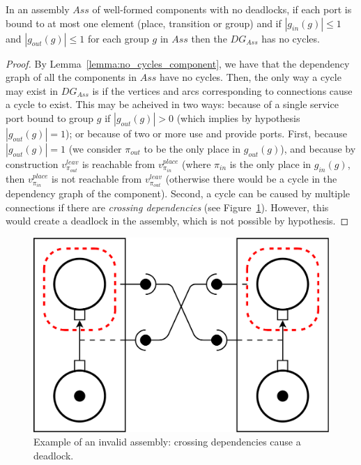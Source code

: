 \begin{lemma}
 In an assembly $Ass$ of well-formed components with no deadlocks, if each port
 is bound to at most one element (place, transition or group) and if
 $\left|g_{in}(g)\right|\leq 1$ and $\left|g_{out}(g)\right|\leq 1$ for each group
 $g$ in $Ass$ then the $DG_{Ass}$ has no cycles.
 \label{lemma:no_cycles_assembly}
\end{lemma}

\begin{proof}
 By Lemma~\ref{lemma:no_cycles_component}, we have that the dependency graph
 of all the components in $Ass$ have no cycles.
 Then, the only way a cycle may exist in $DG_{Ass}$ is if the vertices and arcs
 corresponding to connections cause a cycle to exist.
 This may be acheived in two ways: because of a single service port bound to
 group $g$ if $\left|g_{out}(g)\right|>0$ (which implies by hypothesis
 $\left|g_{out}(g)\right|=1$); or because of two or more use and provide ports.
 First, because $\left|g_{out}(g)\right|=1$ (we consider $\pi_{out}$ to be the only
 place in $g_{out}(g)$), and because by construction $v_{\pi_{out}}^{leav}$ is
 reachable from $v_{\pi_{in}}^{place}$ (where $\pi_{in}$ is the only place in $g_{in}(g)$,
 then $v_{\pi_{in}}^{place}$ is not reachable from $v_{\pi_{out}}^{leav}$ (otherwise
 there would be a cycle in the dependency graph of the component). Second, a
 cycle can be caused by multiple connections if there are \emph{crossing
 dependencies} (see Figure~\ref{fig:deadlock}). However, this would create a
 deadlock in the assembly, which is not possible by hypothesis.
\end{proof}

\begin{figure}[t]
  \begin{center}
    \includegraphics[width=0.5\linewidth]{./images/deadlock.pdf}
  \end{center}
  \caption{Example of an invalid assembly: crossing dependencies cause a deadlock.}
  \label{fig:deadlock}
\end{figure}

